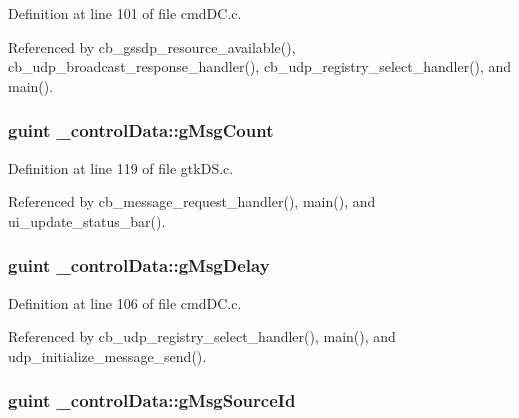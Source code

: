 Definition at line 101 of file cmd\+D\+C.\+c.



Referenced by cb\+\_\+gssdp\+\_\+resource\+\_\+available(), cb\+\_\+udp\+\_\+broadcast\+\_\+response\+\_\+handler(), cb\+\_\+udp\+\_\+registry\+\_\+select\+\_\+handler(), and main().

\hypertarget{struct__control_data_ae797898f8e5ad5c3128da674f86520d1}{}
\subsubsection[{g\+Msg\+Count}]{\setlength{\rightskip}{0pt plus 5cm}guint \+\_\+control\+Data\+::g\+Msg\+Count}\label{struct__control_data_ae797898f8e5ad5c3128da674f86520d1}


Definition at line 119 of file gtk\+D\+S.\+c.



Referenced by cb\+\_\+message\+\_\+request\+\_\+handler(), main(), and ui\+\_\+update\+\_\+status\+\_\+bar().

\hypertarget{struct__control_data_a277ea878a8491fa38269b6c762a05389}{}
\subsubsection[{g\+Msg\+Delay}]{\setlength{\rightskip}{0pt plus 5cm}guint \+\_\+control\+Data\+::g\+Msg\+Delay}\label{struct__control_data_a277ea878a8491fa38269b6c762a05389}


Definition at line 106 of file cmd\+D\+C.\+c.



Referenced by cb\+\_\+udp\+\_\+registry\+\_\+select\+\_\+handler(), main(), and udp\+\_\+initialize\+\_\+message\+\_\+send().

\hypertarget{struct__control_data_a4be65550b087ca645572b8ebc726250d}{}
\subsubsection[{g\+Msg\+Source\+Id}]{\setlength{\rightskip}{0pt plus 5cm}guint \+\_\+control\+Data\+::g\+Msg\+Source\+Id}\label{struct__control_data_a4be65550b087ca645572b8ebc726250d}



